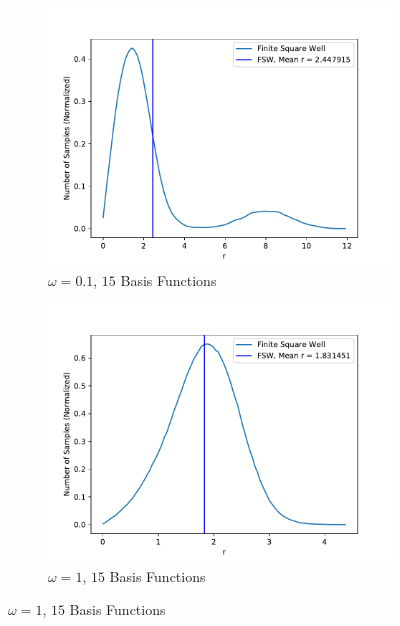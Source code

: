 \documentclass[../main.tex]{subfiles}
\begin{document}
\begin{figure}
\centering
\begin{subfigure}{0.48\textwidth}
\includegraphics[width=\linewidth]{figures/densityFSW/density_FSW_N2_Omega010_2d_BF15.pdf}
\caption{$\omega=0.1$, $15$ Basis Functions} \label{fig:FSW_N2_2d_a}
\end{subfigure}\hspace*{\fill}
\begin{subfigure}{0.48\textwidth}
\includegraphics[width=\linewidth]{figures/densityFSW/density_FSW_N2_Omega1_2d_BF15.pdf}
\caption{$\omega=1$, $15$ Basis Functions} \label{fig:FSW_N2_2d_b}
\end{subfigure}


\end{figure}
\end{document}
